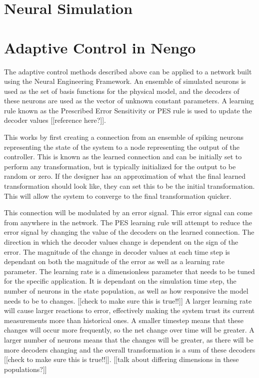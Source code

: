 \documentclass[letterpaper,12pt,titlepage,oneside,final]{book}
\begin{document}
\section{Neural Simulation}


\section{Adaptive Control in Nengo}


The adaptive control methods described above can be applied to a network built using the Neural Engineering Framework. An ensemble of simulated neurons is used as the set of basis functions for the physical model, and the decoders of these neurons are used as the vector of unknown constant parameters. A learning rule known as the Prescribed Error Sensitivity or PES rule is used to update the decoder values [[reference here?]]. 

This works by first creating a connection from an ensemble of spiking neurons representing the state of the system to a node representing the output of the controller. This is known as the learned connection and can be initially set to perform any transformation, but is typically initialized for the output to be random or zero. If the designer has an approximation of what the final learned transformation should look like, they can set this to be the initial transformation. This will allow the system to converge to the final transformation quicker.

This connection will be modulated by an error signal. This error signal can come from anywhere in the network. The PES learning rule will attempt to reduce the error signal by changing the value of the decoders on the learned connection. The direction in which the decoder values change is dependent on the sign of the error. The magnitude of the change in decoder values at each time step is dependant on both the magnitude of the error as well as a learning rate parameter. The learning rate is a dimensionless parameter that needs to be tuned for the specific application. It is dependant on the simulation time step, the number of neurons in the state population, as well as how responsive the model needs to be to changes. [[check to make sure this is true!!]] A larger learning rate will cause larger reactions to error, effectively making the system trust its current measurements more than historical ones. A smaller timestep means that these changes will occur more frequently, so the net change over time will be greater. A larger number of neurons means that the changes will be greater, as there will be more decoders changing and the overall transformation is a sum of these decoders [[check to make sure this is true!!]].
[[talk about differing dimensions in these populations?]]
\end{document}
